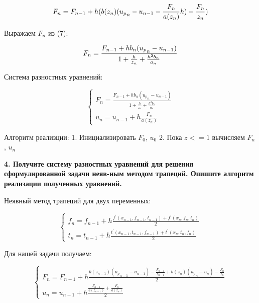 \documentclass[a4paper,12pt]{article}
\begin{document}
    \Large
    \begin{equation}
        F_n = F_{n-1} + h(b(z_n)({u_p}_n - u_{n-1} - \frac{F_n}{a(z_n)} h) - \frac{F_n}{z_n})\\
    \end{equation}
    \normalsize

    Выражаем $F_n$ из (7):

    \Large
    \begin{equation}
        F_n = \frac{F_{n-1} + hb_n({u_p}_n - u_{n-1})}{1 + \frac{h}{z_n} + \frac{h^2b_n}{a_n}}\\
    \end{equation}
    \normalsize
    
    Система разностных уравнений:

    \Large
    \begin{equation}
        \begin{cases}
            F_n = \frac{F_{n-1} + hb_n({u_p}_n - u_{n-1})}{1 + \frac{h}{z_n} + \frac{h^2b_n}{a_n}}\\
            u_n = u_{n-1} + h\frac{F_n}{a(z_n)}
        \end{cases}
    \end{equation}
    \normalsize

    Алгоритм реализции: 1. Инициализировать $F_0$, $u_0$ 2. Пока $z<=1$ вычисляем $F_n$, $u_n$

    \vspace{1cm}
    \textbf{4. Получите систему разностных уравнений для решения сформулированной задачи 
    неяв-ным методом трапеций. Опишите алгоритм реализации полученных уравнений.}

    Неявный метод трапеций для двух переменных: 

    \Large
    \begin{equation}
        \begin{cases}
            f_n = f_{n-1} + h \frac{f^{'}(x_{n-1}, f_{n-1}, t_{n-1}) + f^{'}(x_n, f_n, t_n)}{2}\\
            t_n = t_{n-1} + h \frac{t^{'}(x_{n-1}, t_{n-1}, f_{n-1}) + t^{'}(x_n, t_n, f_n)}{2}
        \end{cases}
    \end{equation}
    \normalsize

    Для нашей задачи получаем:

    \Large
    \begin{equation}
        \begin{cases}
            F_n = F_{n-1} + h \frac{b(z_{n-1})({u_p}_{n-1} - u_{n-1}) - \frac{F_{n-1}}{z_{n-1}} + b(z_n)({u_p}_n - u_n) - \frac{F_n}{z_n}}{2}\\
            u_n = u_{n-1} + h \frac{\frac{F_{n-1}}{a(z_{n-1})} + \frac{F_n}{a(z_n)}}{2}
        \end{cases}
    \end{equation}
    \normalsize
\end{document}
